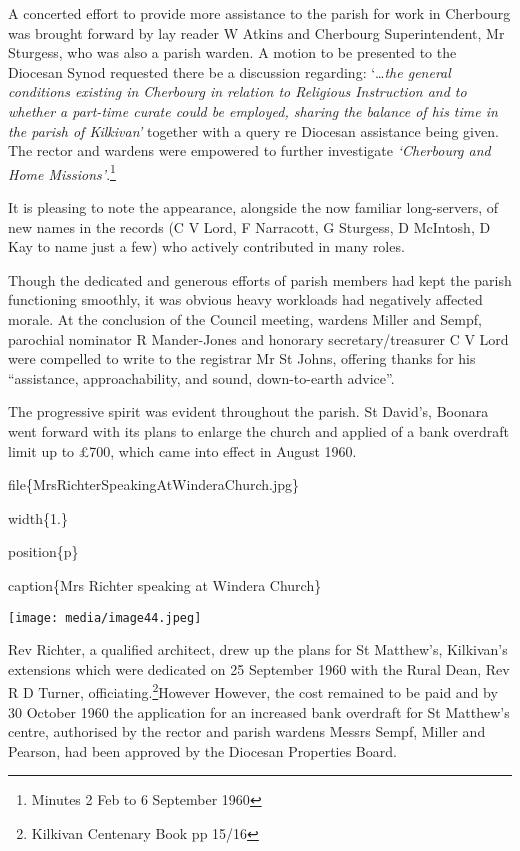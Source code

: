 A concerted effort to provide more assistance to the parish for work in Cherbourg was brought forward by lay reader W Atkins and Cherbourg Superintendent, Mr Sturgess, who was also a parish warden. A motion to be presented to the Diocesan Synod requested there be a discussion regarding: `\ldots{}\emph{the general conditions existing in Cherbourg in relation to Religious Instruction and to whether a part-time curate could be employed, sharing the balance of his time in the parish of Kilkivan'} together with a query re Diocesan assistance being given. The rector and wardens were empowered to further investigate \emph{`Cherbourg and Home Missions'}.\footnote{Minutes 2 Feb to 6 September 1960}

It is pleasing to note the appearance, alongside the now familiar long-servers, of new names in the records (C V Lord, F Narracott, G Sturgess, D McIntosh, D Kay to name just a few) who actively contributed in many roles.

Though the dedicated and generous efforts of parish members had kept the parish functioning smoothly, it was obvious heavy workloads had negatively affected morale. At the conclusion of the Council meeting, wardens Miller and Sempf, parochial nominator R Mander-Jones and honorary secretary/treasurer C V Lord were compelled to write to the registrar Mr St Johns, offering thanks for his ``assistance, approachability, and sound, down-to-earth advice''.

The progressive spirit was evident throughout the parish. St David's, Boonara went forward with its plans to enlarge the church and applied of a bank overdraft limit up to £700, which came into effect in August 1960.

file\{MrsRichterSpeakingAtWinderaChurch.jpg\}

width\{1.\}

position\{p\}

caption\{Mrs Richter speaking at Windera Church\}

\texttt{[image: media/image44.jpeg]}

Rev Richter, a qualified architect, drew up the plans for St Matthew's, Kilkivan's extensions which were dedicated on 25 September 1960 with the Rural Dean, Rev R D Turner, officiating.\footnote{Kilkivan Centenary Book pp 15/16}However However, the cost remained to be paid and by 30 October 1960 the application for an increased bank overdraft for St Matthew's centre, authorised by the rector and parish wardens Messrs Sempf, Miller and Pearson, had been approved by the Diocesan Properties Board.

